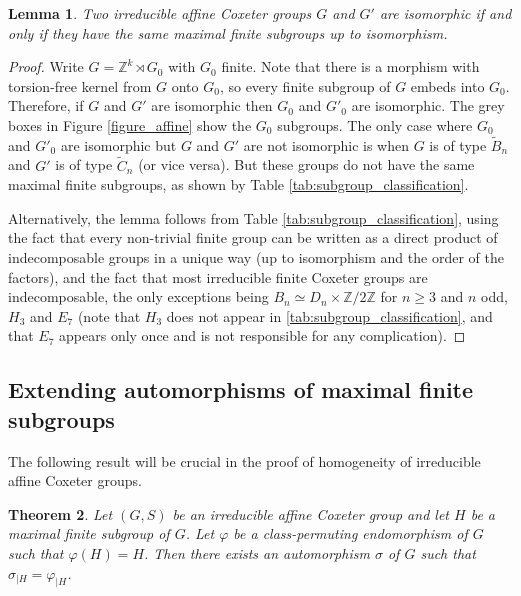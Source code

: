 \documentclass[a4paper, 11pt]{amsart}
\newtheorem{te}{Theorem}[section]
\newtheorem{lemme}[te]{Lemma}
\theoremstyle{definition}
\theoremstyle{remark}
\renewcommand{\geq}{\geqslant}
\begin{document}
\begin{lemme}\label{max_finite}
Two irreducible affine Coxeter groups $G$ and $G'$ are isomorphic if and only if they have the same maximal finite subgroups up to isomorphism.
\end{lemme}

\begin{proof}
Write $G=\mathbb{Z}^k\rtimes G_0$ with $G_0$ finite. Note that there is a morphism with torsion-free kernel from $G$ onto $G_0$, so every finite subgroup of $G$ embeds into $G_0$. Therefore, if $G$ and $G'$ are isomorphic then $G_0$ and $G'_0$ are isomorphic. The grey boxes in Figure \ref{figure_affine} show the $G_0$ subgroups. The only case where $G_0$ and $G'_0$ are isomorphic but $G$ and $G'$ are not isomorphic is when $G$ is of type $\tilde{B}_n$ and $G'$ is of type $\tilde{C}_n$ (or vice versa). But these groups do not have the same maximal finite subgroups, as shown by Table \ref{tab:subgroup_classification}.

Alternatively, the lemma follows from Table \ref{tab:subgroup_classification}, using the fact that every non-trivial finite group can be written as a direct product of indecomposable groups in a unique way (up to isomorphism and the order of the factors), and the fact that most irreducible finite Coxeter groups are indecomposable, the only exceptions being $B_n\simeq D_n\times \mathbb{Z}/2\mathbb{Z}$ for $n\geq 3$ and $n$ odd, $H_3$ and $E_7$ (note that $H_3$ does not appear in \ref{tab:subgroup_classification}, and that $E_7$ appears only once and is not responsible for any complication).\end{proof}

\subsection{Extending automorphisms of maximal finite subgroups}\label{extension_section}

The following result will be crucial in the proof of homogeneity of irreducible affine Coxeter groups.

\begin{te}\label{extension}
Let $(G,S)$ be an irreducible affine Coxeter group and let $H$ be a maximal finite subgroup of $G$. Let $\varphi$ be a class-permuting endomorphism of $G$ such that $\varphi(H)=H$. Then there exists an automorphism $\sigma$ of $G$ such that $\sigma_{\vert H}=\varphi_{\vert H}$.
\end{te}
\end{document}

